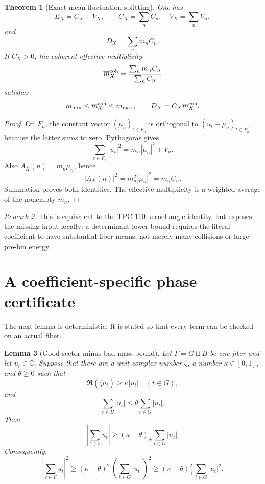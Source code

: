 \documentclass[11pt]{article}
\newtheorem{theorem}{Theorem}[section]
\newtheorem{lemma}[theorem]{Lemma}
\theoremstyle{definition}
\theoremstyle{remark}
\newtheorem{remark}[theorem]{Remark}
\newcommand{\C}{\mathbb C}
\begin{document}
\begin{theorem}[Exact mean-fluctuation splitting]
\label{thm:splitting}
One has
\[
 \boxed{E_X=C_X+V_X,}
 \qquad
 C_X=\sum_n C_n,\quad V_X=\sum_nV_n,
\]
and
\[
 \boxed{D_X=\sum_nm_nC_n.}
\]
If \(C_X>0\), the coherent effective multiplicity
\[
 \overline m_X^{\rm coh}
 =\frac{\sum_nm_nC_n}{\sum_nC_n}
\]
satisfies
\[
 m_{\min}\le\overline m_X^{\rm coh}\le m_{\max},
 \qquad
 D_X=C_X\overline m_X^{\rm coh}.
\]
\end{theorem}

\begin{proof}
On \(F_n\), the constant vector \((\mu_n)_{t\in F_n}\) is orthogonal
to \((u_t-\mu_n)_{t\in F_n}\), because the latter sums to zero.
Pythagoras gives
\[
 \sum_{t\in F_n}|u_t|^2=m_n|\mu_n|^2+V_n.
\]
Also \(A_X(n)=m_n\mu_n\), hence
\[
 |A_X(n)|^2=m_n^2|\mu_n|^2=m_nC_n.
\]
Summation proves both identities.  The effective multiplicity is a
weighted average of the nonempty \(m_n\).
\end{proof}

\begin{remark}
This is equivalent to the TPC-110 kernel-angle identity, but exposes
the missing input locally: a determinant lower bound requires the
literal coefficient to have substantial fiber means, not merely
many collisions or large pre-bin energy.
\end{remark}

\section{A coefficient-specific phase certificate}

The next lemma is deterministic.  It is stated so that every term can
be checked on an actual fiber.

\begin{lemma}[Good-sector minus bad-mass bound]
\label{lem:sector}
Let \(F=G\sqcup B\) be one fiber and let \(u_t\in\C\).  Suppose that
there are a unit complex number \(\zeta\), a number
\(\kappa\in[0,1]\), and \(\theta\ge0\) such that
\[
 \Re(\overline\zeta u_t)\ge\kappa|u_t|
 \quad(t\in G),
\]
and
\[
 \sum_{t\in B}|u_t|
 \le\theta\sum_{t\in G}|u_t|.
\]
Then
\[
 \boxed{
 \left|\sum_{t\in F}u_t\right|
 \ge(\kappa-\theta)_+
 \sum_{t\in G}|u_t|.}
\]
Consequently,
\[
 \left|\sum_{t\in F}u_t\right|^2
 \ge(\kappa-\theta)_+^2
 \left(\sum_{t\in G}|u_t|\right)^2
 \ge(\kappa-\theta)_+^2
 \sum_{t\in G}|u_t|^2.
\]
\end{lemma}
\end{document}
